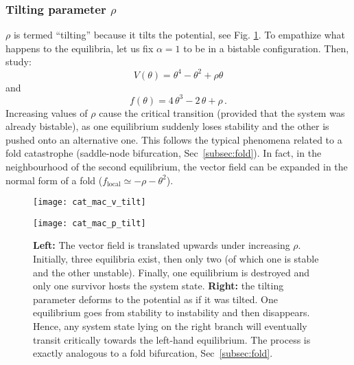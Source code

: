 \tocless\subsubsection{Tilting parameter $\rho$}
$\rho$ is termed ``tilting'' because it tilts the potential, see Fig. \ref{fig:cm_tilting}. To empathize what happens to the equilibria, let us fix $\alpha = 1$ to be in a bistable configuration. Then, study:
\begin{equation}
	V(\theta) = \theta^4 - \theta^2 + \rho \theta
\end{equation}
and 
\begin{equation}
	f(\theta) = 4 \, \theta^3 - 2 \,  \theta + \rho \, .
	\label{eq:potrho}
\end{equation}
Increasing values of $\rho$ cause the critical transition (provided that the system was already bistable), as one equilibrium suddenly loses stability and the other is pushed onto an alternative one. This follows the typical phenomena related to a fold catastrophe (saddle-node bifurcation, Sec~\ref{subsec:fold}). In fact, in the neighbourhood of the second equilibrium, the vector field can be expanded in the normal form of a fold ($f_{\text{local}} \simeq - \rho - \theta ^2$).\\


\begin{figure}[h]
	\centering
	\begin{minipage}[c]{0.48\textwidth}
		\texttt{[image: cat\_mac\_v\_tilt]}
		\renewcommand{\figurename}{Fig.}
	\end{minipage}
	\hspace{0.05cm}
	\begin{minipage}[c]{0.48\textwidth}
		\texttt{[image: cat\_mac\_p\_tilt]}
		\renewcommand{\figurename}{Fig.}
	\end{minipage} 
	\caption{\small \textbf{Left:} The vector field is translated upwards under increasing $\rho$. Initially, three equilibria exist, then only two (of which one is stable and the other unstable). Finally, one equilibrium is destroyed and only one survivor hosts the system state. \textbf{Right:} the tilting parameter deforms to the potential as if it was tilted. One equilibrium goes from stability to instability and then disappears. Hence, any system state lying on the right branch will eventually transit critically towards the left-hand equilibrium. The process is exactly analogous to a fold bifurcation, Sec~\ref{subsec:fold}.}
	\label{fig:cm_tilting}
\end{figure}




